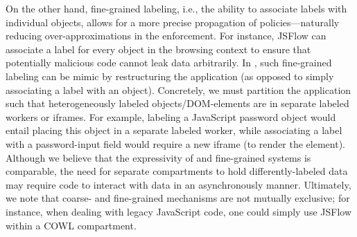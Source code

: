 On the other hand, fine-grained labeling, i.e., the ability to associate labels with
individual objects, allows for a more precise propagation of
policies---naturally reducing over-approximations in the enforcement. 
%
For instance, JSFlow can associate a label for every object in 
the browsing context to ensure that potentially malicious code 
cannot leak data arbitrarily. 
%
In \sys{}, such fine-grained labeling can be mimic by restructuring the
application (as opposed to simply associating a label with an object).
%
Concretely, we must partition the application such that
heterogeneously labeled objects/DOM-elements are in separate labeled
workers or iframes.
%
For example, labeling a JavaScript password object would entail
placing this object in a separate labeled worker, while associating a
label with a password-input field would require a new iframe (to
render the element).
%
Although we believe that the expressivity of \sys{} 
and fine-grained systems is comparable, the need for separate compartments
to hold differently-labeled data may require code to interact with 
data in an asynchronously manner. 
%
Ultimately, we note that coarse- and fine-grained mechanisms are not mutually
exclusive; for instance, when dealing with legacy JavaScript code, one
could simply use JSFlow within a COWL compartment. 



